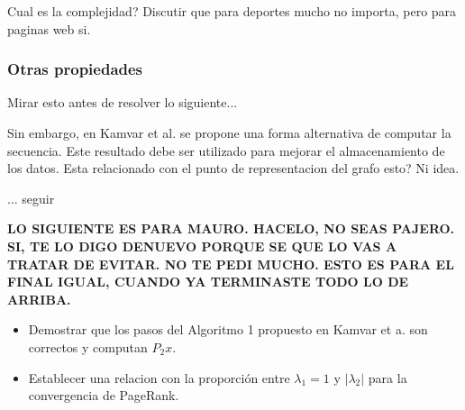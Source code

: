 Cual es la complejidad? Discutir que para deportes mucho no importa, pero para paginas web si.

\subsubsection{Otras propiedades}

Mirar esto antes de resolver lo siguiente...

Sin embargo, en Kamvar et al. se propone una forma alternativa de computar la secuencia. Este resultado debe ser utilizado para mejorar el almacenamiento de los datos. Esta relacionado con el punto de representacion del grafo esto? Ni idea.

... seguir

\textbf{LO SIGUIENTE ES PARA MAURO. HACELO, NO SEAS PAJERO. SI, TE LO DIGO DENUEVO PORQUE SE QUE LO VAS A TRATAR DE EVITAR. NO TE PEDI MUCHO. ESTO ES PARA EL FINAL IGUAL, CUANDO YA TERMINASTE TODO LO DE ARRIBA.}

\begin{itemize}
\item Demostrar que los pasos del Algoritmo 1 propuesto en Kamvar et a. son correctos y computan $P_2x$.
\item Establecer una relacion con la proporción entre $\lambda_1 = 1$  y $|\lambda_2|$ para la convergencia de PageRank.
\end{itemize}